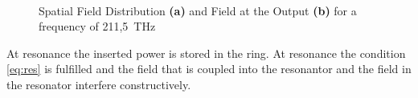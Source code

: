 \begin{figure}%
\centering
	\\%
\caption{Spatial Field Distribution \textbf{(a)} and Field at the Output \textbf{(b)} for a frequency of 211,5~THz}%
\label{fig:13_42}%
\end{figure}





% 
At resonance the inserted power is stored in the ring. At resonance the condition \eqref{eq:res} is fulfilled and the field that is coupled into the resonantor and the field in the resonator interfere constructively. 

